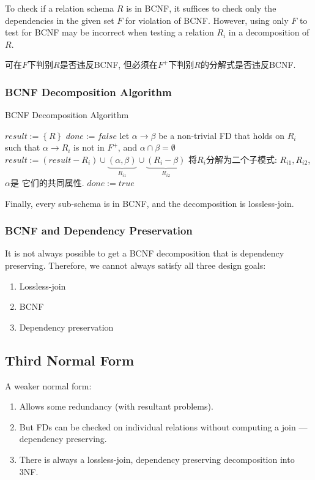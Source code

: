 To check if a relation schema $R$ is in BCNF, it suffices to check only the dependencies in the given set $F$ for violation of BCNF. However, using only $F$ to test for BCNF may be incorrect when testing a relation $R_i$ in a decomposition of $R$.

可在$F$下判别$R$是否违反BCNF, 但必须在$F^+$下判别$R$的分解式是否违反BCNF.


\subsubsection{BCNF Decomposition Algorithm}
\begin{algorithm}[H]
    \caption{BCNF Decomposition Algorithm}
    \begin{algorithmic}
        \State $result:=\left\{ R \right\}$
        \State $done:=false$
                \State let $\alpha\rightarrow \beta$ be a non-trivial FD that holds on $R_i$ such that $\alpha \rightarrow R_i$ is not in $F^+$, and $\alpha \cap \beta =\emptyset$
                \State $result:=(result - R_i) \cup \underbrace{(\alpha, \beta)}_{R_{i1}} \cup \underbrace{(R_i-\beta)}_{R_{i2}} $ \Comment 将$R_i$分解为二个子模式: $R_{i1}, R_{i2}$, $\alpha$是 它们的共同属性.
            \Else 
                \State $done:=true$
            \EndIf
        \EndWhile
    \end{algorithmic}
\end{algorithm}
Finally, every sub-schema is in BCNF, and the decomposition is lossless-join.

\subsubsection{BCNF and Dependency Preservation}
It is not always possible to get a BCNF decomposition that is dependency preserving. Therefore, we cannot always satisfy all three design goals:
\begin{enumerate}\small
    \item Lossless-join
    \item BCNF
    \item Dependency preservation
\end{enumerate}

\subsection{Third Normal Form}
A weaker normal form: 
\begin{enumerate}\small
    \item Allows some redundancy (with resultant problems).
    \item But FDs can be checked on individual relations without computing a join --- dependency preserving.
    \item There is always a lossless-join, dependency preserving decomposition into 3NF.
\end{enumerate}

